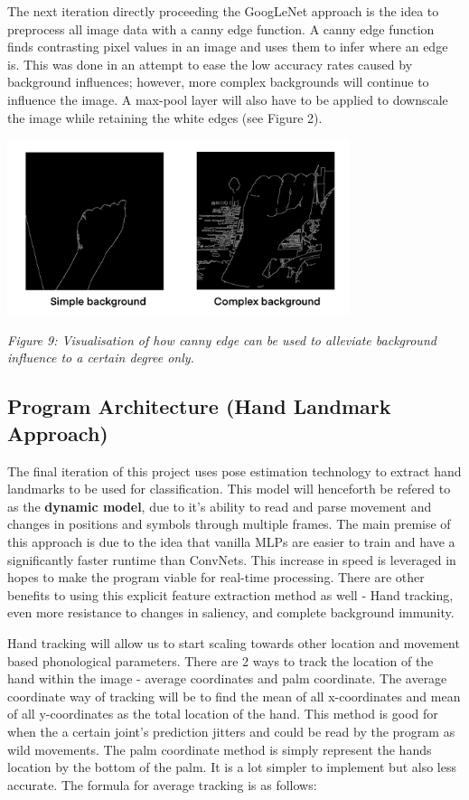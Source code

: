 \documentclass[11pt]{article}
\begin{document}
        The next iteration directly proceeding the GoogLeNet approach is the idea to preprocess all image data with a canny edge function. A canny edge function finds contrasting pixel values in an image and uses them to infer where an edge is. This was done in an attempt to ease the low accuracy rates caused by background influences; however, more complex backgrounds will continue to influence the image. A max-pool layer will also have to be applied to downscale the image while retaining the white edges (see Figure 2). 

        \begin{center}
            \includegraphics[width=10cm]{images/canny.png}
            \\
            \raggedright \textit{
            Figure 9: Visualisation of how canny edge can be used to alleviate background influence to a certain degree only.
            }
        \end{center}

    \subsection{Program Architecture (Hand Landmark Approach)}
        The final iteration of this project uses pose estimation technology to extract hand landmarks to be used for classification. This model will henceforth be refered to as the \textbf{dynamic model}, due to it's ability to read and parse movement and changes in positions and symbols through multiple frames. The main premise of this approach is due to the idea that vanilla MLPs are easier to train and have a significantly faster runtime than ConvNets. This increase in speed is leveraged in hopes to make the program viable for real-time processing. There are other benefits to using this explicit feature extraction method as well - Hand tracking, even more resistance to changes in saliency, and complete background immunity. 

        Hand tracking will allow us to start scaling towards other location and movement based phonological parameters. There are 2 ways to track the location of the hand within the image - average coordinates and palm coordinate. The average coordinate way of tracking will be to find the mean of all x-coordinates and mean of all y-coordinates as the total location of the hand. This method is good for when the a certain joint's prediction jitters and could be read by the program as wild movements. The palm coordinate method is simply represent the hands location by the bottom of the palm. It is a lot simpler to implement but also less accurate. The formula for average tracking is as follows:
\end{document}
